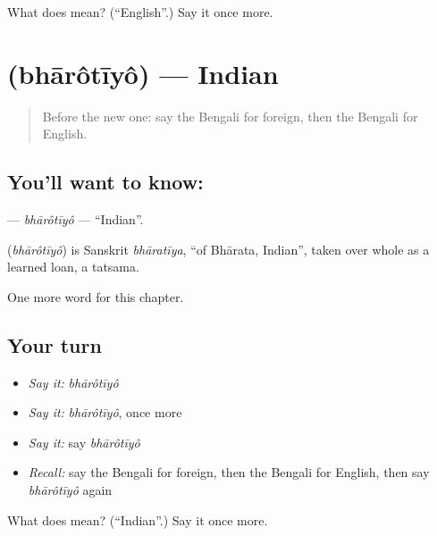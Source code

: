 \begin{tcolorbox}[breakable,colback=teal!4,colframe=teal!35!black,title={Before you move on}]
What does  mean? (\textquotedblleft{}English\textquotedblright{}.) Say it once more.
\end{tcolorbox}
\section[\texorpdfstring{\bn{ভারতীয়} (bhārôtīyô)}{ভারতীয় (bhārôtīyô)}]{ (bhārôtīyô) — Indian}

\label{lesson:BN-C246-bharotiyo}



\begin{quote}
Before the new one: say the Bengali for foreign, then the Bengali for English.
\end{quote}

\subsection*{You'll want to know: }
\textbf{} — \emph{bhārôtīyô} — \textquotedblleft{}Indian\textquotedblright{}.

\begin{cousinweb}
\textbf{} (\emph{bhārôtīyô}) is Sanskrit \emph{bhāratīya}, \textquotedblleft{}of Bhārata, Indian\textquotedblright{}, taken over whole as a learned loan, a tatsama.
\end{cousinweb}

\begin{grammarlens}[title={What you've built}]
One more word for this chapter.
\end{grammarlens}

\subsection*{Your turn}
\begin{itemize}
\raggedright
  \item \emph{Say it:} \emph{bhārôtīyô}
  \item \emph{Say it:} \emph{bhārôtīyô}, once more
  \item \emph{Say it:} say \emph{bhārôtīyô}
  \item \emph{Recall:} say the Bengali for foreign, then the Bengali for English, then say \emph{bhārôtīyô} again
\end{itemize}

\begin{tcolorbox}[breakable,colback=teal!4,colframe=teal!35!black,title={Before you move on}]
What does  mean? (\textquotedblleft{}Indian\textquotedblright{}.) Say it once more.
\end{tcolorbox}
